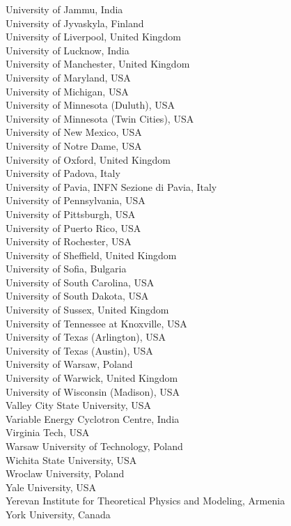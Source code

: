 \begin{center}
University of Jammu, India \\
University of Jyvaskyla, Finland \\
University of Liverpool, United Kingdom \\
University of Lucknow, India \\
University of Manchester, United Kingdom \\
University of Maryland, USA \\
University of Michigan, USA \\
University of Minnesota (Duluth), USA \\
University of Minnesota (Twin Cities), USA \\
University of New Mexico, USA \\
University of Notre Dame, USA \\
University of Oxford, United Kingdom \\
University of Padova, Italy \\
University of Pavia, INFN Sezione di Pavia, Italy \\
University of Pennsylvania, USA \\
University of Pittsburgh, USA \\
University of Puerto Rico, USA \\
University of Rochester, USA \\
University of Sheffield, United Kingdom \\
University of Sofia, Bulgaria \\
University of South Carolina, USA \\
University of South Dakota, USA \\
University of Sussex, United Kingdom \\
University of Tennessee at Knoxville, USA \\
University of Texas (Arlington), USA \\
University of Texas (Austin), USA \\
University of Warsaw, Poland \\
University of Warwick, United Kingdom \\
University of Wisconsin (Madison), USA \\
Valley City State University, USA \\
Variable Energy Cyclotron Centre, India \\
Virginia Tech, USA \\
Warsaw University of Technology, Poland \\
Wichita State University, USA \\
Wroclaw University, Poland \\
Yale University, USA \\
Yerevan Institute for Theoretical Physics and Modeling, Armenia \\
York University, Canada \\


\end{center}